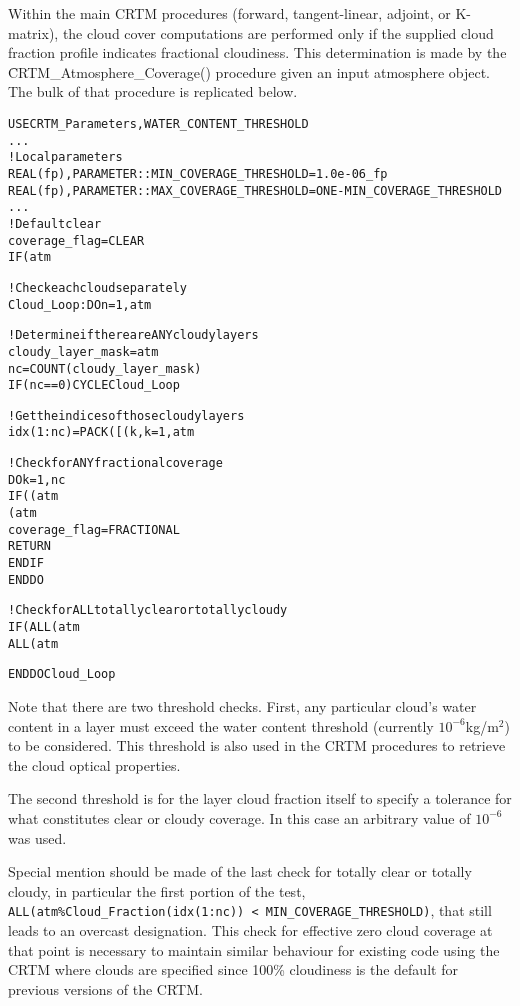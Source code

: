 Within the main CRTM procedures (forward, tangent-linear, adjoint, or K-matrix), the cloud cover computations are performed only if the supplied cloud fraction profile indicates fractional cloudiness. This determination is made by the \f{CRTM\_Atmosphere\_Coverage()} procedure given an  input atmosphere object. The bulk of that procedure is replicated below.

\begin{alltt}
  USE CRTM_Parameters, WATER_CONTENT_THRESHOLD
  ...
  ! Local parameters
  REAL(fp), PARAMETER :: MIN_COVERAGE_THRESHOLD = 1.0e-06_fp
  REAL(fp), PARAMETER :: MAX_COVERAGE_THRESHOLD = ONE - MIN_COVERAGE_THRESHOLD
  ...
  ! Default clear
  coverage_flag = CLEAR
  IF ( atm%n_Clouds == 0 ) RETURN

  ! Check each cloud separately
  Cloud_Loop: DO n = 1, atm%n_Clouds
  
    ! Determine if there are ANY cloudy layers
    cloudy_layer_mask = atm%Cloud(n)%Water_Content > WATER_CONTENT_THRESHOLD
    nc = COUNT(cloudy_layer_mask)
    IF ( nc == 0 ) CYCLE Cloud_Loop

    ! Get the indices of those cloudy layers
    idx(1:nc) = PACK([(k, k=1,atm%Cloud(n)%n_Layers)], cloudy_layer_mask)

    ! Check for ANY fractional coverage
    DO k = 1, nc
      IF ( (atm%Cloud_Fraction(idx(k)) > MIN_COVERAGE_THRESHOLD) .AND. &
           (atm%Cloud_Fraction(idx(k)) < MAX_COVERAGE_THRESHOLD) ) THEN
        coverage_flag = FRACTIONAL
        RETURN
      END IF
    END DO

    ! Check for ALL totally clear or totally cloudy
    IF ( ALL(atm%Cloud_Fraction(idx(1:nc)) < MIN_COVERAGE_THRESHOLD) .OR. &
         ALL(atm%Cloud_Fraction(idx(1:nc)) > MAX_COVERAGE_THRESHOLD) ) coverage_flag = OVERCAST
    
  END DO Cloud_Loop\end{alltt}

Note that there are two threshold checks. First, any particular cloud's water content in a layer must exceed the water content threshold (currently $10^{-6}$kg/m$^2$) to be considered. This threshold is also used in the CRTM procedures to retrieve the cloud optical properties.

The second threshold is for the layer cloud fraction itself to specify a tolerance for what constitutes clear or cloudy coverage. In this case an arbitrary value of $10^{-6}$ was used.

Special mention should be made of the last check for totally clear or totally cloudy, in particular the first portion of the test, \texttt{ALL(atm\%Cloud\_Fraction(idx(1:nc)) < MIN\_COVERAGE\_THRESHOLD)}, that still leads to an overcast designation. This check for effective zero cloud coverage at that point is necessary to maintain similar behaviour for existing code using the CRTM where clouds are specified since 100\% cloudiness is the default for previous versions of the CRTM.


